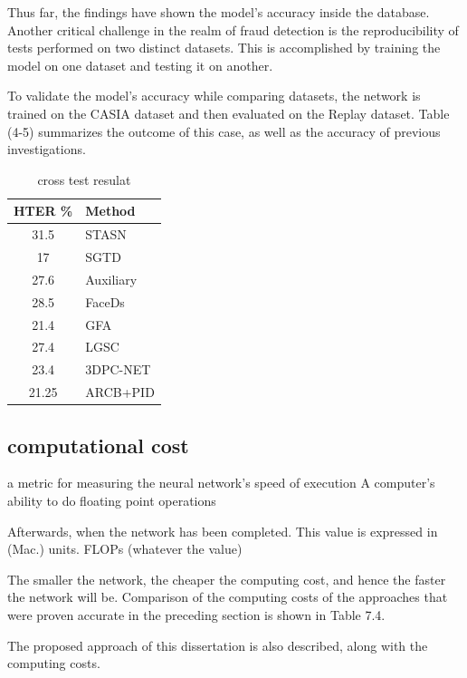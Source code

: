 \documentclass[journal]{IEEEtran}
\begin{document}
Thus far, the findings have shown the model's accuracy inside the database. Another critical challenge in the realm of fraud detection is the reproducibility of tests performed on two distinct datasets. This is accomplished by training the model on one dataset and testing it on another.

To validate the model's accuracy while comparing datasets, the network is trained on the CASIA dataset and then evaluated on the Replay dataset. Table (4-5) summarizes the outcome of this case, as well as the accuracy of previous investigations.

\begin{table}[!h]
	\caption{cross test resulat }
	\label{tab:cross}
	\centering
\begin{tabular}{|c|l|}
\hline HTER \% & Method             \\
\hline 31.5        & \cite{yang2019face} STASN \\
\hline 17          &  \cite{wang2020deep} SGTD \\
\hline 27.6        & \cite{liu2018learning} Auxiliary   \\
\hline 28.5        & \cite{jourabloo2018face} FaceDs\\
\hline 21.4        & \cite{tu2020learning}GFA  \\
\hline 27.4        & \cite{feng2020learning} LGSC \\
\hline 23.4        & \cite{li20203dpc}   3DPC-NET \\
\hline 21.25        & ARCB+PID \\ 
\hline
\end{tabular}
\end{table}
\subsection{computational cost }

a metric for measuring the neural network's speed of execution
A computer's ability to do floating point operations

Afterwards, when the network has been completed.
This value is expressed in (Mac.) units.
FLOPs (whatever the value)

The smaller the network, the cheaper the computing cost, and hence the faster the network will be.
Comparison of the computing costs of the approaches that were proven accurate in the preceding section is shown in Table 7.4.

The proposed approach of this dissertation is also described, along with the computing costs.
\end{document}
